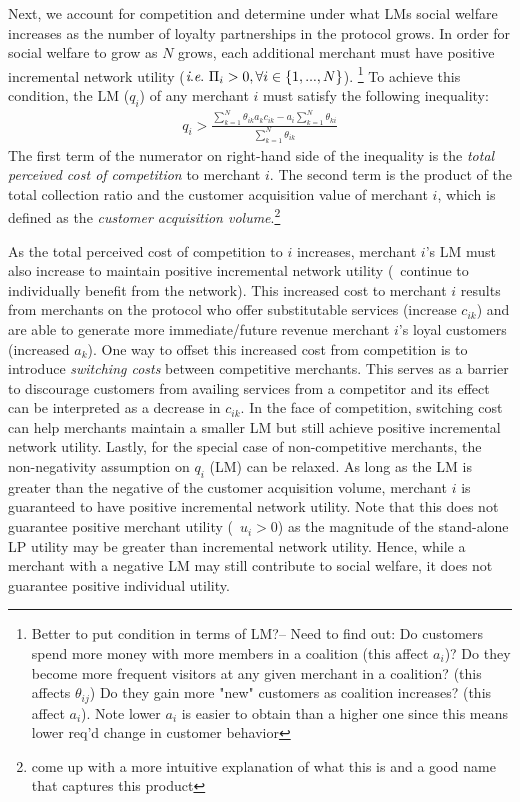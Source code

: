 Next, we account for competition and determine under what LMs social welfare increases as the number of loyalty partnerships in the protocol grows. In order for social welfare to grow as $N$ grows, each additional merchant must have positive incremental network utility ($\textit{i}.\textit{e}.\ \Pi_i > 0, \forall i \in \{1,...,N\}$). 
%
\footnote{Better to put condition in terms of LM?-- Need to find out: Do customers spend more money with more members in a coalition (this affect $a_i$)? Do they become more frequent visitors at any given merchant in a coalition? (this affects $\theta_{ij}$) Do they gain more "new" customers as coalition increases? (this affect $a_i$). Note lower $a_i$ is easier to obtain than a higher one since this means lower req'd change in customer behavior}
%
To achieve this condition, the LM ($q_i$) of any merchant $i$ must satisfy the following inequality:
\begin{align*}
q_i > \frac{\sum_{k=1}^N \theta_{ik} a_k c_{ik} - a_i \sum_{k=1}^N \theta_{ki}}{\sum_{k=1}^N \theta_{ik}}
\end{align*}
%
The first term of the numerator on right-hand side of the inequality is the \textit{total perceived cost of competition} to merchant $i$. The second term is the product of the total collection ratio and the customer acquisition value of merchant $i$, which is defined as the \textit{customer acquisition volume}.\footnote{come up with a more intuitive explanation of what this is and a good name that captures this product}

As the total perceived cost of competition to $i$ increases, merchant $i$'s LM must also increase to maintain positive incremental network utility (\ie\ continue to individually benefit from the network). This increased cost to merchant $i$ results from merchants on the protocol who offer substitutable services (increase $c_{ik}$) and are able to generate more immediate/future revenue merchant $i$'s loyal customers (increased $a_{k}$). One way to offset this increased cost from competition is to introduce \textit{switching costs} between competitive merchants. This serves as a barrier to discourage customers from availing services from a competitor and its effect can be interpreted as a decrease in $c_{ik}$. In the face of competition, switching cost can help merchants maintain a smaller LM but still achieve positive incremental network utility.  Lastly, for the special case of non-competitive merchants, the non-negativity assumption on $q_i$ (LM) can be relaxed. As long as the LM is greater than the negative of the customer acquisition volume, merchant $i$ is guaranteed to have positive incremental network utility. Note that this does not guarantee positive merchant utility (\ie\ $u_i > 0$) as the magnitude of the stand-alone LP utility may be greater than incremental network utility. Hence, while a merchant with a negative LM may still contribute to social welfare, it does not guarantee positive individual utility. 

